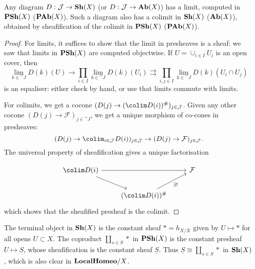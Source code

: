 \documentclass[../main.tex]{subfiles}
\begin{document}
\begin{thm}\label{thm:limits-colimits-sheaves}
	Any diagram $D: \mathcal{J} \to \operatorname{\mathbf{Sh}}(X)$ (or $D: \mathcal{J} \to \operatorname{\mathbf{Ab}}(X)$) has a limit, computed in $\operatorname{\mathbf{PSh}}(X)$ ($\operatorname{\mathbf{PAb}}(X)$).
	Such a diagram also has a colimit in $\operatorname{\mathbf{Sh}}(X)$ ($\operatorname{\mathbf{Ab}}(X)$), obtained by sheafification of the colimit in $\operatorname{\mathbf{PSh}}(X)$ ($\operatorname{\mathbf{PAb}}(X)$).
\end{thm}
\begin{proof}
   For limits, it suffices to show that the limit in presheaves is a sheaf: we saw that limits in $\operatorname{\mathbf{PSh}}(X)$ are computed objectwise. If $U = \cup_{i \in I}U_i$ is an open cover, then \[
    \lim_{k \in \cat J}D(k)(U) \to \prod_{i \in I} \lim_{k \in \cat J}D(k)(U_i) \rightrightarrows \prod_{i, j \in I} \lim_{k \in \cat J} D(k)(U_i \cap U_j)
   \] is an equaliser: either check by hand, or use that limits commute with limits.

   For colimits, we get a cocone $(D(j) \to (\colim D(i))^\#)_{j \in \cat J}$. Given any other cocone $(D(j) \to \mathcal{F})_{j \in \cat J}$, we get a unique morphism of co-cones in presheaves:
   \[
    (D(j) \to \colim_{i \in \cat J} D(i))_{j \in \cat J} \to (D(j) \to \mathcal{F})_{j \in \cat J}.
   \] The universal property of sheafification gives a unique factorisation 
   
  \[\begin{tikzcd}
\colim D(i) \arrow[rr] \arrow[rd] &                                           & \mathcal{F} \\
                                  & (\colim D(i))^\# \arrow[ru, "\exists !"'] &            
\end{tikzcd}\] which shows that the sheafified presheaf is the colimit. 
\end{proof}
\begin{exmp}
    The terminal object in $\operatorname{\mathbf{Sh}}(X)$ is the constant sheaf $*=h_{X/X}$ given by $U\mapsto *$ for all opens $U \subset X$. The coproduct $\coprod_{s \in S} *$ in $\operatorname{\mathbf{PSh}}(X)$ is the constant presheaf $U \mapsto S$, whose sheafification is the constant sheaf $\underline{S}$. Thus $\underline{S} \cong \coprod_{s \in S} *$ in $\operatorname{\mathbf{Sh}}(X)$, which is also clear in $\mathbf{LocalHomeo}{/X}$. 
\end{exmp}
\end{document}
